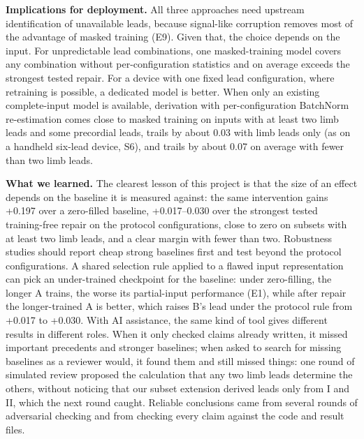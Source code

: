 \textbf{Implications for deployment.} All three approaches need upstream identification of unavailable leads, because signal-like corruption removes most of the advantage of masked training (E9). Given that, the choice depends on the input. For unpredictable lead combinations, one masked-training model covers any combination without per-configuration statistics and on average exceeds the strongest tested repair. For a device with one fixed lead configuration, where retraining is possible, a dedicated model is better. When only an existing complete-input model is available, derivation with per-configuration BatchNorm re-estimation comes close to masked training on inputs with at least two limb leads and some precordial leads, trails by about 0.03 with limb leads only (as on a handheld six-lead device, S6), and trails by about 0.07 on average with fewer than two limb leads.

\textbf{What we learned.} The clearest lesson of this project is that the size of an effect depends on the baseline it is measured against: the same intervention gains +0.197 over a zero-filled baseline, +0.017--0.030 over the strongest tested training-free repair on the protocol configurations, close to zero on subsets with at least two limb leads, and a clear margin with fewer than two. Robustness studies should report cheap strong baselines first and test beyond the protocol configurations. A shared selection rule applied to a flawed input representation can pick an under-trained checkpoint for the baseline: under zero-filling, the longer A trains, the worse its partial-input performance (E1), while after repair the longer-trained A is better, which raises B's lead under the protocol rule from +0.017 to +0.030. With AI assistance, the same kind of tool gives different results in different roles. When it only checked claims already written, it missed important precedents and stronger baselines; when asked to search for missing baselines as a reviewer would, it found them and still missed things: one round of simulated review proposed the calculation that any two limb leads determine the others, without noticing that our subset extension derived leads only from I and II, which the next round caught. Reliable conclusions came from several rounds of adversarial checking and from checking every claim against the code and result files.

